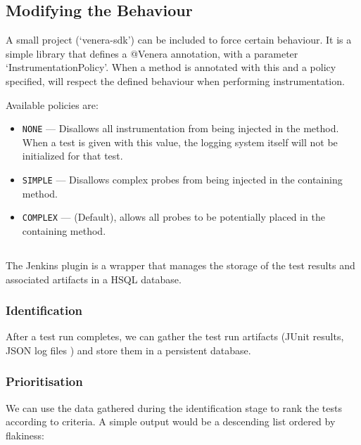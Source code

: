 \subsection{Modifying the Behaviour}

A small project ({\lq}venera-sdk{\rq}) can be included to force certain
behaviour. It is a simple library that defines a @Venera annotation, with a
parameter {\lq}InstrumentationPolicy{\rq}. When a method is annotated with this
and a policy specified, \venera will respect the defined behaviour when
performing instrumentation.

Available policies are:

\begin{itemize}
  \item {\tt NONE} --- Disallows all instrumentation from being injected in the
  method. When a test is given with this value, the logging system itself will
  not be initialized for that test.
  \item {\tt SIMPLE} --- Disallows complex probes from being injected in the
  containing method.
  \item {\tt COMPLEX} --- (Default), allows all probes to be potentially placed
  in the containing method.
\end{itemize}


\subsection{\jenkinsPlugin}
\label{sec:sec:jenkins_plugin}

The Jenkins plugin is a wrapper that manages the storage of the test results and
associated artifacts in a HSQL database.

\subsubsection{Identification}

After a test run completes, we can gather the test run artifacts (JUnit results,
\venera JSON log files \etc) and store them in a persistent database.

\subsubsection{Prioritisation}

We can use the data gathered during the identification stage to rank the tests
according to criteria. A simple output would be a descending list ordered by
flakiness:

